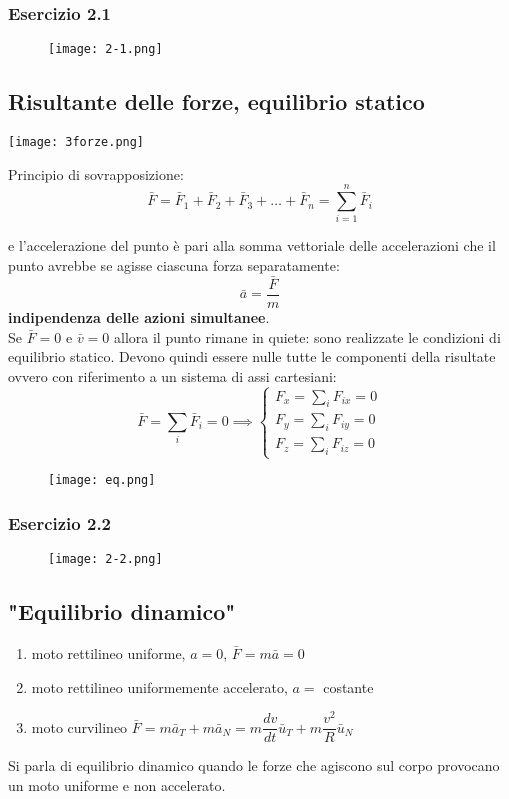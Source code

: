\documentclass[../../main.tex]{subfiles}
\begin{document}
\subsubsection{Esercizio 2.1}
\begin{figure}[H]
    \centering
    \texttt{[image: 2-1.png]}
\end{figure}

\subsection{Risultante delle forze, equilibrio statico}
\begin{minipage}
    {0.5\textwidth}
    \centering
    \texttt{[image: 3forze.png]}
\end{minipage}
\begin{minipage}{0.5\textwidth}
    \centering
    Principio di sovrapposizione:\\
    \[
        \bar F = \bar F_1 + \bar F_2 + \bar F_3 + \ldots + \bar F_n = \sum_{i=1}^{n} \bar F_i
    \]
\end{minipage}
e l'accelerazione del punto è pari alla somma vettoriale delle accelerazioni che il punto avrebbe se agisse ciascuna forza separatamente:
\[
    \bar a = \dfrac{\bar F}{m}
\]
\textbf{indipendenza delle azioni simultanee}.\\
Se $\bar F = 0$ e $\bar v = 0$ allora il punto rimane in quiete: sono realizzate le condizioni di equilibrio statico. Devono quindi essere nulle tutte le componenti della risultate ovvero con riferimento a un sistema di assi cartesiani:
\[
    \bar F = \sum_{i} \bar F_i = 0 \implies \begin{cases}
        F_x = \sum_i F_{ix} = 0 \\
        F_y = \sum_i F_{iy} = 0 \\
        F_z = \sum_i F_{iz} = 0
    \end{cases}
\]
\begin{figure}[H]
    \centering
    \texttt{[image: eq.png]}
\end{figure}
\subsubsection{Esercizio 2.2}
\begin{figure}[H]
    \centering
    \texttt{[image: 2-2.png]}
\end{figure}

\subsection{"Equilibrio dinamico"}
\begin{enumerate}
    \item moto rettilineo uniforme, $a = 0$, $\bar F = m\bar a = 0$
    \item moto rettilineo uniformemente accelerato, $a =$ costante
    \item moto curvilineo $\bar F = m\bar a_T + m\bar a_N = m\dfrac{dv}{dt} \bar u_T + m\dfrac{v^2}{R} \bar u_N$
\end{enumerate}
Si parla di equilibrio dinamico quando le forze che agiscono sul corpo provocano un moto uniforme e non accelerato.
\end{document}
